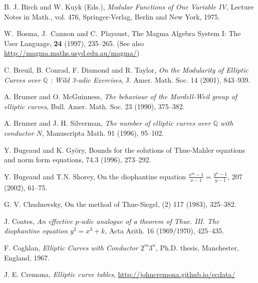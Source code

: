 \begin{thebibliography}{}
B. J. Birch and W. Kuyk (Eds.),
\emph{Modular Functions of One Variable IV},
Lecture Notes in Math., vol. 476, Springer-Verlag, Berlin and New York, 1975.

W.\ Bosma, J.\ Cannon and C.\ Playoust,
\newblock The Magma Algebra System I: The User Language,
 {\bf 24} (1997), 235--265. (See also \url{http://magma.maths.usyd.edu.au/magma/})

C. Breuil, B. Conrad, F. Diamond and R. Taylor,
\emph{On the Modularity of Elliptic Curves over $\mathbb{Q}$ : Wild 3-adic Exercises},
J. Amer. Math. Soc. 14 (2001), 843--939.

A. Brumer and O. McGuinness,
\emph{The behaviour of the Mordell-Weil group of elliptic curves},
Bull. Amer. Math. Soc. 23 (1990), 375--382.

A. Brumer and J. H. Silverman,
\emph{The number of elliptic curves over $\mathbb{Q}$ with conductor $N$},
Manuscripta Math. 91 (1996), 95--102.

Y. Bugeaud and K. Gy\"{o}ry, 
\newblock Bounds for the solutions of Thue-Mahler equations and norm form equations, 
 74.3 (1996), 273--292.

Y. Bugeaud and T.N. Shorey,
\newblock On the diophantine equation $\frac{x^m-1}{x-1} = \frac{y^n-1}{y-1}$,
  207 (2002), 61--75.

G. V. Chudnovsky, 
\newblock On the method of Thue-Siegel, 
 (2) 117 (1983), 325--382. 

J. Coates,
\emph{An effective $p$-adic analogue of a theorem of Thue. III. The diophantine equation $y^2=x^3+k$},
Acta Arith. 16 (1969/1970), 425--435.


F. Coghlan,
\emph{Elliptic Curves with Conductor $2^m3^n$},
Ph.D. thesis, Manchester, England, 1967.


J. E. Cremona,
\emph{Elliptic curve tables}, 
\url{http://johncremona.github.io/ecdata/}


\end{thebibliography}
